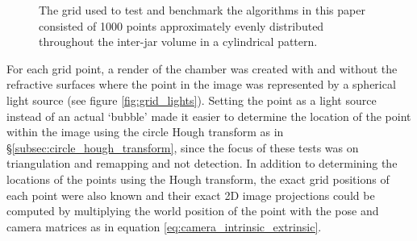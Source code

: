 \documentclass[11pt, letterpaper]{extarticle} %
\begin{document}
\begin{figure}[h]
    \centering
    \hfill
    \caption{The grid used to test and benchmark the algorithms in this paper consisted of 1000 points approximately evenly distributed throughout the inter-jar volume in a cylindrical pattern.}
    \label{fig:testing_grid}
\end{figure}

For each grid point, a render of the chamber was created with and without the refractive surfaces where the point in the image was represented by a spherical light source (see figure \ref{fig:grid_lights}). Setting the point as a light source instead of an actual `bubble' made it easier to determine the location of the point within the image using the circle Hough transform as in \S\ref{subsec:circle_hough_transform}, since the focus of these tests was on triangulation and remapping and not detection. In addition to determining the locations of the points using the Hough transform, the exact grid positions of each point were also known and their exact 2D image projections could be computed by multiplying the world position of the point with the pose and camera matrices as in equation \ref{eq:camera_intrinsic_extrinsic}. 
\end{document}
